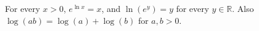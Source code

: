 For every $x > 0$, $e^{\ln x} = x$, and $\ln(e^{y}) = y$ for every $y \in \mathbb{R}$.
Also $\log(ab) = \log(a) + \log(b)$ for $a, b > 0$.